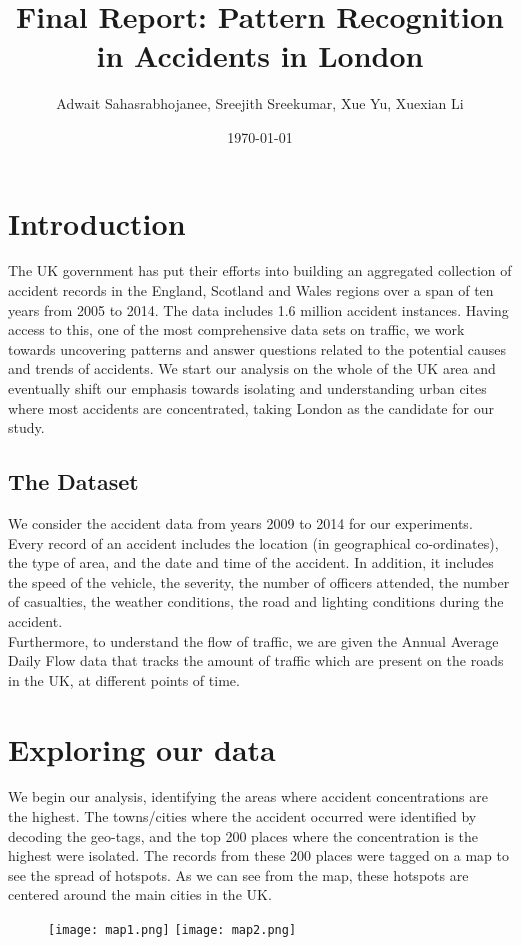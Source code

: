\documentclass{neu_handout}
\title{Final Report: Pattern Recognition in Accidents in London}
\author{Adwait Sahasrabhojanee, Sreejith Sreekumar, Xue Yu, Xuexian Li}
\date{\today}
\begin{document}
\section{Introduction}
The UK government has put their efforts into building an aggregated collection of accident records in the England, Scotland and Wales regions
over a span of ten years from 2005 to 2014. The data includes 1.6 million accident instances. Having access to this, one of the most comprehensive data sets on traffic, we work towards
uncovering patterns and answer questions related to the potential causes and trends of accidents. We start our analysis on the whole of the UK area and eventually shift our emphasis towards
isolating and understanding urban cites where most accidents are concentrated, taking London as the candidate for our study.

\subsection{The Dataset}
We consider the accident data from years 2009 to 2014 for our experiments. Every record of an accident includes the location (in geographical co-ordinates), the type of area, and the date and time of the accident. In addition, it includes the speed of the vehicle, the severity, the number of officers attended, the number of casualties, the weather conditions, the road and lighting conditions during the accident. \\

Furthermore, to understand the flow of traffic, we are given the Annual Average Daily Flow data that tracks the amount of traffic which are present on the roads in the UK, at different points of time. \\

\section{Exploring our data}
We begin our analysis, identifying the areas where accident concentrations are the highest. The towns/cities where the accident occurred were identified by decoding the geo-tags, and the top 200 places where the concentration is the highest were isolated. The records from these 200 places were tagged on a map to see the spread of hotspots. As we can see from the map, these hotspots are centered around the main cities in the UK.

\begin{figure}[!htb]
  \texttt{[image: map1.png]}
  \endminipage\hfill
{}
  \texttt{[image: map2.png]}
\endminipage
\end{figure}
\end{document}
